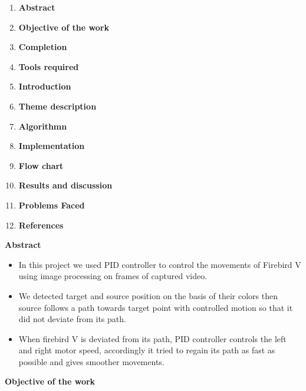 \documentclass[report]{res}
\begin{document}
	\begin{enumerate}
	
		\item \textbf{\Large Abstract}
		\item \textbf{\Large Objective of the work}
		\item \textbf{\Large Completion}
		\item \textbf{\Large Tools required}
		\item \textbf{\Large Introduction}
		\item \textbf{\Large Theme description}
		\item \textbf{\Large Algorithmn}
		\item \textbf{\Large Implementation}
		\item \textbf{\Large Flow chart}
		\item \textbf{\Large Results and discussion}
		\item \textbf{\Large Problems Faced}
		\item \textbf{\Large References}
		
	\end{enumerate}
	
	\pagebreak
	
	
	\begin{center}
		\textbf{\huge Abstract} \\
	\end{center}
    
    \begin{itemize}
    	
    \item In this project we used PID controller to control the movements of Firebird V using image processing on frames of captured video. 
    \item We detected target and source position on the basis of their colors then source follows a path towards target point with controlled motion so that it did not deviate from its path.
    \item When firebird V is deviated from its path, PID controller controls the left and right motor speed, accordingly it tried to regain its path as fast as possible and gives smoother movements.
	
	\end{itemize}
	
	\pagebreak
	
	
	\begin{center}
		\textbf{\huge Objective of the work} \\
	\end{center}
	
\end{document}
